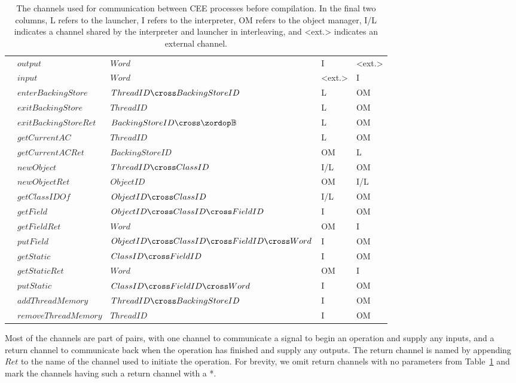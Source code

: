 \begin{table}[thp]
\begin{center}
\begin{tabular}{@{}llp{6cm}ll}
      & $output$ & $Word$ & I & \textless{}ext.\textgreater{} \\
      & $input$ & $Word$ & \textless{}ext.\textgreater{} & I \\
      & $enterBackingStore$ & $ThreadID \cross BackingStoreID$ & L & OM \\
      & $exitBackingStore$ & $ThreadID$ & L & OM  \\
      & $exitBackingStoreRet$ & $BackingStoreID \cross \boolean$ & L & OM \\
      & $getCurrentAC$ & $ThreadID$ & L & OM \\
      & $getCurrentACRet$ & $BackingStoreID$ & OM & L \\
      & $newObject$ & $ThreadID \cross ClassID$ & I/L & OM  \\
      & $newObjectRet$ & $ObjectID$ & OM & I/L  \\
      & $getClassIDOf$ & $ObjectID \cross ClassID$ & I/L & OM  \\
      & $getField$ & $ObjectID \cross ClassID \cross FieldID$ & I & OM \\
      & $getFieldRet$ & $Word$ & OM & I \\
      & $putField$ & $ObjectID \cross ClassID \cross FieldID \cross Word$ & I & OM \\
      & $getStatic$ & $ClassID \cross FieldID$ & I & OM \\
      & $getStaticRet$ & $Word$ & OM & I \\
      & $putStatic$ & $ClassID \cross FieldID \cross Word$ & I & OM \\
      & $addThreadMemory$ & $ThreadID \cross BackingStoreID$ & I & OM \\
      & $removeThreadMemory$ & $ThreadID$ & I & OM \\       
      \hline
    \end{tabular}
  \end{center}
  \caption{The channels used for communication between CEE processes
    before compilation. 
    In the final two columns, L refers to the launcher, I refers to
    the interpreter, OM refers to the object manager, I/L indicates a
    channel shared by the interpreter and launcher in interleaving,
    and \textless{}ext.\textgreater{} indicates an external channel.}
  \label{cee-channel-table}
\end{table}

Most of the channels are part of pairs, with one channel to
communicate a signal to begin an operation and supply any inputs, and
a return channel to communicate back when the operation has finished
and supply any outputs.
The return channel is named by appending $Ret$ to the name of the
channel used to initiate the operation.
For brevity, we omit return channels with no parameters from
Table~\ref{cee-channel-table} and mark the channels having such a
return channel with a *.

